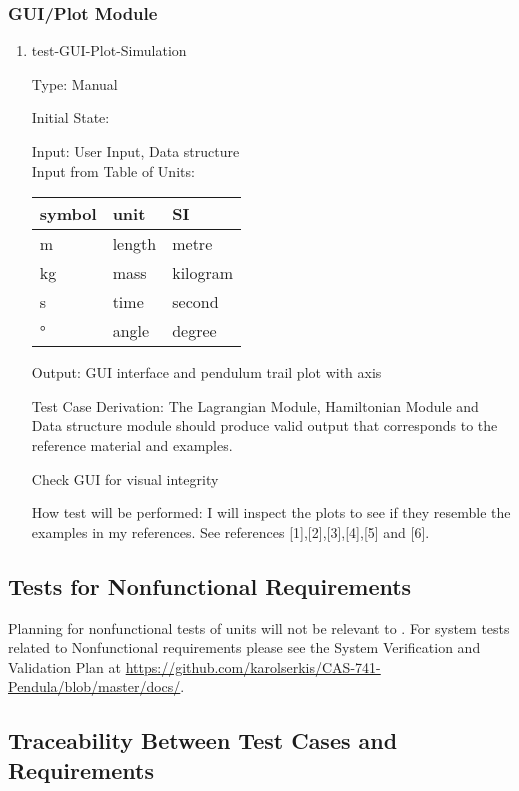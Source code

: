 \documentclass[12pt, titlepage]{article}
\begin{document}
{\subsubsection{GUI/Plot Module} 

\begin{enumerate}				
	\item{test-GUI-Plot-Simulation\\}
	
	Type: Manual
	
	Initial State: 
	
	Input: User Input, Data structure\\
	Input from Table of Units:\\
  \noindent \begin{tabular}{l l l} 
    \toprule		
    \textbf{symbol} & \textbf{unit} & \textbf{SI}\\
    \midrule 
    \si{\metre} & length & metre\\
    \si{\kilogram} & mass & kilogram\\
    \si{\second} & time & second\\
    \si{\degree} & angle & degree\\
    \bottomrule
  \end{tabular}
	
	Output: GUI interface and pendulum trail plot with axis
	
	Test Case Derivation: The Lagrangian Module, Hamiltonian Module and 
	Data structure module should produce valid
	output that corresponds to the reference material and examples.
	
	Check GUI for visual integrity
	
	How test will be performed: I will inspect the plots to see if 
	they resemble the examples in my references. See references 
	[1],[2],[3],[4],[5] and [6].
\end{enumerate} 

\subsection{Tests for Nonfunctional Requirements}

Planning for nonfunctional tests of units will not be relevant to \progname. 
For system tests related to Nonfunctional requirements please see the System 
Verification and Validation Plan at 
\url{https://github.com/karolserkis/CAS-741-Pendula/blob/master/docs/}. 

\subsection{Traceability Between Test Cases and Requirements}

}
\end{document}
